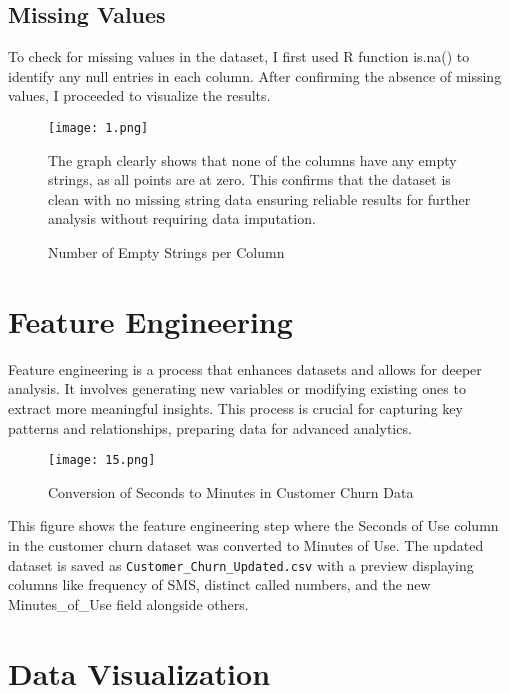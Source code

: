 \documentclass[12pt]{article}
\begin{document}
\subsection{Missing Values}
To check for missing values in the dataset, I first used R function     is.na() to identify any null entries in each column. After confirming the absence of missing values, I proceeded to visualize the results.
\begin{figure}[h]
    \centering
    \texttt{[image: 1.png]}  
    \caption{Number of Empty Strings per Column}
        \label{fig:example}
   \vspace{0.5cm}
     
\justifying The graph clearly shows that none of the columns have any empty strings, as all points are at zero. This confirms that the dataset is clean with no missing string data ensuring reliable results for further analysis without requiring data imputation.
\end{figure}

\newpage


\section{Feature Engineering}
Feature engineering is a process that enhances datasets and allows for deeper analysis. It involves generating new variables or modifying existing ones to extract more meaningful insights. This process is crucial for capturing key patterns and relationships, preparing data for advanced analytics.

\begin{figure}[h]
    \centering
    \texttt{[image: 15.png]}  
    \caption{Conversion of Seconds to Minutes in Customer Churn Data}
        \label{fig:example}
   \vspace{0.5cm}
\end{figure}

This figure shows the feature engineering step where the Seconds of Use column in the customer churn dataset was converted to Minutes of Use. The updated dataset is saved as \texttt{Customer\_Churn\_Updated.csv} with a preview displaying columns like frequency of SMS, distinct called numbers, and the new Minutes\_of\_Use field alongside others.
\newpage

\section{Data Visualization}
\end{document}
